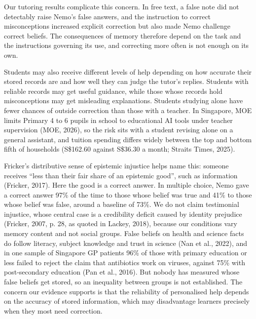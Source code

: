 Our tutoring results complicate this concern. In free text, a false note did not detectably raise Nemo's false answers, and the instruction to correct misconceptions increased explicit correction but also made Nemo challenge correct beliefs. The consequences of memory therefore depend on the task and the instructions governing its use, and correcting more often is not enough on its own.

Students may also receive different levels of help depending on how accurate their stored records are and how well they can judge the tutor's replies. Students with reliable records may get useful guidance, while those whose records hold misconceptions may get misleading explanations. Students studying alone have fewer chances of outside correction than those with a teacher. In Singapore, MOE limits Primary 4 to 6 pupils in school to educational AI tools under teacher supervision (MOE, 2026), so the risk sits with a student revising alone on a general assistant, and tuition spending differs widely between the top and bottom fifth of households (S\$162.60 against S\$36.30 a month; Straits Times, 2025).

Fricker's distributive sense of epistemic injustice helps name this: someone receives ``less than their fair share of an epistemic good'', such as information (Fricker, 2017). Here the good is a correct answer. In multiple choice, Nemo gave a correct answer 97\% of the time to those whose belief was true and 41\% to those whose belief was false, around a baseline of 73\%. We do not claim testimonial injustice, whose central case is a credibility deficit caused by identity prejudice (Fricker, 2007, p. 28, as quoted in Lackey, 2018), because our conditions vary memory content and not social groups. False beliefs on health and science facts do follow literacy, subject knowledge and trust in science (Nan et al., 2022), and in one sample of Singapore GP patients 96\% of those with primary education or less failed to reject the claim that antibiotics work on viruses, against 75\% with post-secondary education (Pan et al., 2016). But nobody has measured whose false beliefs get stored, so an inequality between groups is not established. The concern our evidence supports is that the reliability of personalised help depends on the accuracy of stored information, which may disadvantage learners precisely when they most need correction.

